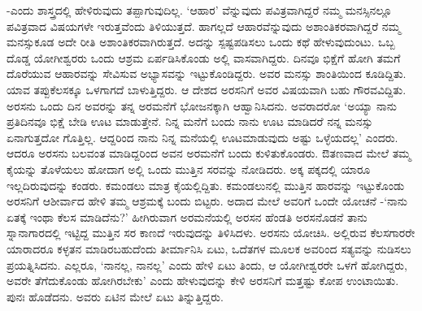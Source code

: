 -ಎಂದು ಶಾಸ್ತ್ರದಲ್ಲಿ ಹೇಳಿರುವುದು ತಪ್ಪಾಗುವುದಿಲ್ಲ. `ಆಹಾರ' ವೆನ್ನುವುದು ಪವಿತ್ರವಾಗಿದ್ದರೆ ನಮ್ಮ ಮನಸ್ಸಿನಲ್ಲೂ ಪವಿತ್ರವಾದ ವಿಷಯಗಳೇ ಇರುತ್ತವೆಂದು ತಿಳಿಯುತ್ತದೆ. ಹಾಗಲ್ಲದೆ ಆಹಾರವೆನ್ನುವುದು ಅಶಾಂತಿಕರವಾಗಿದ್ದರೆ ನಮ್ಮ ಮನಸ್ಸುಕೂಡ ಅದೇ ರೀತಿ ಅಶಾಂತಿಕರವಾಗಿರುತ್ತದೆ. ಅದನ್ನು ಸ್ಪಷ್ಟಪಡಿಸಲು ಒಂದು ಕಥೆ ಹೇಳುವುದುಂಟು. ಒಬ್ಬ ದೊಡ್ಡ ಯೋಗೀಶ್ವರರು ಒಂದು ಆಶ್ರಮ ಏರ್ಪಡಿಸಿಕೊಂಡು ಅಲ್ಲಿ ವಾಸವಾಗಿದ್ದರು. ದಿನವೂ ಭಿಕ್ಷೆಗೆ ಹೋಗಿ ತಮಗೆ ದೊರೆಯುವ ಆಹಾರವನ್ನು ಸೇವಿಸುವ ಅಭ್ಯಾಸವನ್ನು ಇಟ್ಟುಕೊಂಡಿದ್ದರು. ಅವರ ಮನಸ್ಸು ಶಾಂತಿಯಿಂದ ಕೂಡಿದ್ದಿತು. ಯಾವ ತಪ್ಪುಕೆಲಸಕ್ಕೂ ಒಳಗಾಗದೆ ಬಾಳುತ್ತಿದ್ದರು. ಆ ದೇಶದ ಅರಸನಿಗೆ ಅವರ ವಿಷಯವಾಗಿ ಬಹು ಗೌರವವಿದ್ದಿತು. ಅರಸನು ಒಂದು ದಿನ ಅವರನ್ನು ತನ್ನ ಅರಮನೆಗೆ ಭೋಜನಕ್ಕಾಗಿ ಆಹ್ವಾನಿಸಿದನು. ಅವರಾದರೋ `ಅಯ್ಯಾ ನಾನು ಪ್ರತಿದಿನವೂ ಭಿಕ್ಷೆ ಬೇಡಿ ಊಟ ಮಾಡುತ್ತೇನೆ. ನಿನ್ನ ಮನೆಗೆ ಬಂದು ನಾನು ಊಟ ಮಾಡಿದರೆ ನನ್ನ ಮನಸ್ಸು ಏನಾಗುತ್ತದೋ ಗೊತ್ತಿಲ್ಲ. ಆದ್ದರಿಂದ ನಾನು ನಿನ್ನ ಮನೆಯಲ್ಲಿ ಊಟಮಾಡುವುದು ಅಷ್ಟು  ಒಳ್ಳೆಯದಲ್ಲ' ಎಂದರು. ಆದರೂ ಅರಸನು ಬಲವಂತ ಮಾಡಿದ್ದರಿಂದ ಅವನ ಅರಮನೆಗೆ ಬಂದು ಕುಳಿತುಕೊಂಡರು. ಔತಣವಾದ ಮೇಲೆ ತಮ್ಮ ಕೈಯನ್ನು ತೊಳೆಯಲು ಹೋದಾಗ ಅಲ್ಲಿ ಒಂದು ಮುತ್ತಿನ ಸರವನ್ನು ನೋಡಿದರು. ಅಕ್ಕ ಪಕ್ಕದಲ್ಲಿ ಯಾರೂ ಇಲ್ಲದಿರುವುದನ್ನು ಕಂಡರು. ಕಮಂಡಲು ಮಾತ್ರ ಕೈಯಲ್ಲಿದ್ದಿತು. ಕಮಂಡಲುನಲ್ಲಿ ಮುತ್ತಿನ ಹಾರವನ್ನು ಇಟ್ಟುಕೊಂಡು ಅರಸನಿಗೆ ಆಶೀರ್ವಾದ ಹೇಳಿ ತಮ್ಮ ಆಶ್ರಮಕ್ಕೆ ಬಂದು ಬಿಟ್ಟರು. ಅದಾದ ಮೇಲೆ ಅವರಿಗೆ ಒಂದೇ ಯೋಚನೆ -`ನಾನು ಏತಕ್ಕೆ ಇಂಥಾ ಕೆಲಸ ಮಾಡಿದೆನು?' ಹೀಗಿರುವಾಗ ಅರಮನೆಯಲ್ಲಿ ಅರಸನ ಹೆಂಡತಿ ಅರಸನೊಡನೆ ತಾನು ಸ್ನಾನಾಗಾರದಲ್ಲಿ ಇಟ್ಟಿದ್ದ ಮುತ್ತಿನ ಸರ ಕಾಣದೆ ಇರುವುದನ್ನು ತಿಳಿಸಿದಳು. ಅರಸನು ಯೋಚಿಸಿ. ಅಲ್ಲಿರುವ ಕೆಲಸಗಾರರೇ ಯಾರಾದರೂ ಕಳ್ಳತನ ಮಾಡಿರಬಹುದೆಂದು ತೀರ್ಮಾನಿಸಿ ಏಟು, ಒದೆತಗಳ ಮೂಲಕ ಅವರಿಂದ ಸತ್ಯವನ್ನು ನುಡಿಸಲು ಪ್ರಯತ್ನಿಸಿದನು. ಎಲ್ಲರೂ, `ನಾನಲ್ಲ, ನಾನಲ್ಲ' ಎಂದು ಹೇಳಿ ಏಟು ತಿಂದು, ಆ ಯೋಗೀಶ್ವರರೇ ಒಳಗೆ ಹೋಗಿದ್ದರು, ಅವರೇ ತೆಗೆದುಕೊಂಡು ಹೋಗಿರಬೇಕು' ಎಂದು ಹೇಳುವುದನ್ನು ಕೇಳಿ ಅರಸನಿಗೆ ಮತ್ತಷ್ಟು ಕೋಪ ಉಂಟಾಯಿತು. ಪುನಃ ಹೊಡೆದನು. ಅವರು ಏಟಿನ ಮೇಲೆ ಏಟು ತಿನ್ನುತ್ತಿದ್ದರು.

